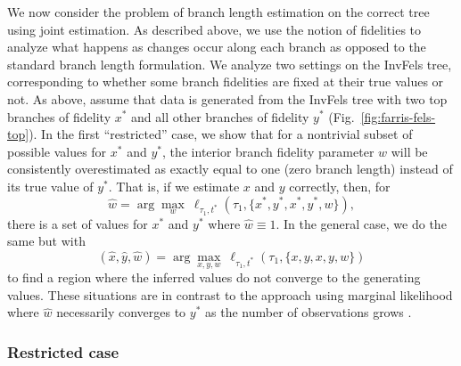 \documentclass[11pt]{article}
\begin{document}
We now consider the problem of branch length estimation on the correct tree using joint estimation.
As described above, we use the notion of fidelities to analyze what happens as changes occur along each branch as opposed to the standard branch length formulation.
We analyze two settings on the InvFels tree, corresponding to whether some branch fidelities are fixed at their true values or not.
As above, assume that data is generated from the InvFels tree with two top branches of fidelity $x^*$ and all other branches of fidelity $y^*$ (Fig.~\ref{fig:farris-fels-top}).
In the first ``restricted'' case, we show that for a nontrivial subset of possible values for $x^*$ and $y^*$, the interior branch fidelity parameter $w$ will be consistently overestimated as exactly equal to one (zero branch length) instead of its true value of $y^*$.
That is, if we estimate $x$ and $y$ correctly, then, for
\[
\hat{w} = \arg\max_{w} \ \ell_{\tau_1,t^*}(\tau_1, \{x^*,y^*,x^*,y^*,w\}),
\]
there is a set of values for $x^*$ and $y^*$ where $\hat{w}\equiv 1$.
In the general case, we do the same but with
\[
(\hat{x}, \hat{y}, \hat{w}) = \arg\max_{x,y,w} \ \ell_{\tau_1,t^*}(\tau_1, \{x,y,x,y,w\})
\]
to find a region where the inferred values do not converge to the generating values.
These situations are in contrast to the approach using marginal likelihood where $\hat{w}$ necessarily converges to $y^*$ as the number of observations grows \citep{RoyChoudhury2015-ta}.

\subsubsection*{Restricted case}
\end{document}
